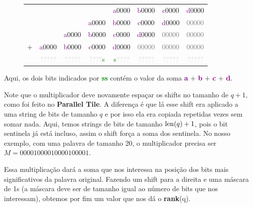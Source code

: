 \begin{figure}[h]
\bf \Large \centering
\begin{tabular}{cccccccc}
& & & & \textcolor{Purple}{a}\textcolor{CarnationPink}{0000} &
\textcolor{Purple}{b}\textcolor{CarnationPink}{0000} &
\textcolor{Purple}{c}\textcolor{CarnationPink}{0000} &
\textcolor{Purple}{d}\textcolor{CarnationPink}{0000} \\
& & & \textcolor{Purple}{a}\textcolor{CarnationPink}{0000} &
\textcolor{Purple}{b}\textcolor{CarnationPink}{0000} &
\textcolor{Purple}{c}\textcolor{CarnationPink}{0000} &
\textcolor{Purple}{d}\textcolor{CarnationPink}{0000} &
\textcolor{gray}{00000} \\
& & \textcolor{Purple}{a}\textcolor{CarnationPink}{0000} &
\textcolor{Purple}{b}\textcolor{CarnationPink}{0000} &
\textcolor{Purple}{c}\textcolor{CarnationPink}{0000} &
\textcolor{Purple}{d}\textcolor{CarnationPink}{0000} &
\textcolor{gray}{00000} &
\textcolor{gray}{00000} \\
$+$ & \textcolor{Purple}{a}\textcolor{CarnationPink}{0000} & \textcolor{Purple}{b}\textcolor{CarnationPink}{0000} &
\textcolor{Purple}{c}\textcolor{CarnationPink}{0000} & 
\textcolor{Purple}{d}\textcolor{CarnationPink}{0000} & 
\textcolor{gray}{00000} & 
\textcolor{gray}{00000} & 
\textcolor{gray}{00000} \\
\hline
& \textcolor{lightgray}{?????} &
\textcolor{lightgray}{?????} & 
\textcolor{lightgray}{????}\textcolor{Green}{s} & 
\textcolor{Green}{s}\textcolor{lightgray}{????} & 
\textcolor{lightgray}{?????} &
\textcolor{lightgray}{?????} & 
\textcolor{lightgray}{?????}
\end{tabular}
\end{figure}

Aqui, os dois bits indicados por \textbf{\textcolor{Green}{ss}} contém o valor
da soma \textbf{\textcolor{Purple}{a}} $+$ \textbf{\textcolor{Purple}{b}} $+$
\textbf{\textcolor{Purple}{c}} $+$ \textbf{\textcolor{Purple}{d}}.

Note que o multiplicador deve novamente espaçar os shifts no tamanho de $q+1$,
como foi feito no \textbf{Parallel Tile}. A diferença é que lá esse shift era
aplicado a uma string de bits de tamanho $q$ e por isso ela era copiada
repetidas vezes sem somar nada. Aqui, temos strings de bits de tamanho
$\operatorname{len}(q)+1$, pois o bit sentinela já está incluso, assim o shift força a soma
dos sentinela. No nosso exemplo, com uma palavra de tamanho 20, o multiplicador
precisa ser $M=00001000010000100001$.

Essa multiplicação dará a soma que nos interessa na posição dos bits mais
significativos da palavra original. Fazendo um shift para a direita e uma
máscara de 1s (a máscara deve ser de tamanho igual ao número de bits que nos
interessam), obtemos por fim um valor que nos dá o \textbf{rank}(q).

